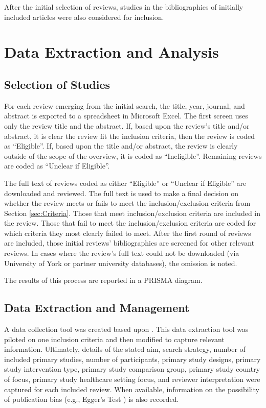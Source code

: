 \documentclass[12pt]{article}
\begin{document}
After the initial selection of reviews, studies in the bibliographies of initially included articles were also considered for inclusion.

\section{Data Extraction and Analysis}
\subsection{Selection of Studies}

For each review emerging from the initial search, the title, year, journal, and abstract is exported to a spreadsheet in Microsoft Excel. The first screen uses only the review title and the abstract. If, based upon the review's title and/or abstract, it is clear the review fit the inclusion criteria, then the review is coded as ``Eligible''. If, based upon the title and/or abstract, the review is clearly outside of the scope of the overview, it is coded as ``Ineligible''. Remaining reviews are coded as ``Unclear if Eligible''.

The full text of reviews coded as either ``Eligible'' or ``Unclear if Eligible'' are downloaded and reviewed. The full text is used to make a final decision on whether the review meets or fails to meet the inclusion/exclusion criteria from Section \ref{sec:Criteria}. Those that meet inclusion/exclusion criteria are included in the review. Those that fail to meet the inclusion/exclusion criteria are coded for which criteria they most clearly failed to meet. After the first round of reviews are included, those initial reviews' bibliographies are screened for other relevant reviews. In cases where the review's full text could not be downloaded (via University of York or partner university databases), the omission is noted.

The results of this process are reported in a PRISMA diagram.

\subsection{Data Extraction and Management}

A data collection tool was created based upon \citep{flodgrenOverviewReviewsEvaluating2011}. This data extraction tool was piloted on one inclusion criteria and then modified to capture relevant information. Ultimately, details of the stated aim, search strategy, number of included primary studies, number of participants, primary study designs, primary study intervention type, primary study comparison group, primary study country of focus, primary study healthcare setting focus, and reviewer interpretation were captured for each included review. When available, information on the possibility of publication bias (e.g., Egger's Test \citep{sterneFunnelPlotsDetecting2001}) is also recorded.
\end{document}
